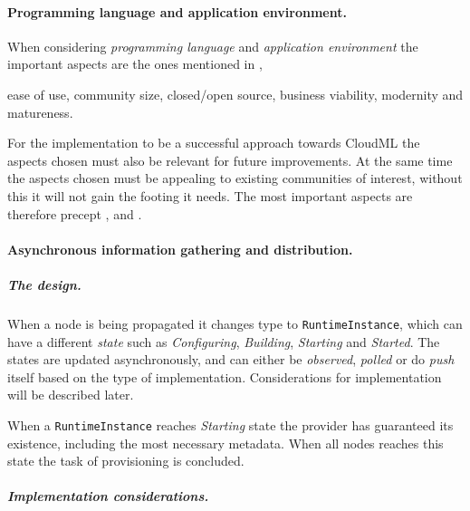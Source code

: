 


\paragraph{Programming language and application environment.}

When considering \emph{programming language} and \emph{application environment} 
the important aspects are the ones mentioned in ,
\begin{ii}
  \iitem ease of use,
  \iitem community size,
  \iitem closed/open source,
  \iitem business viability,
  \iitem modernity and 
  \iitem matureness.
\end{ii}
For the implementation to be a successful approach towards CloudML 
the aspects chosen must also be relevant for future improvements.
At the same time the aspects chosen must be appealing to existing communities of interest,
without this it will not gain the footing it needs.
The most important aspects are therefore precept ,  and .

\paragraph{Asynchronous information gathering and distribution.}

\subparagraph{The design.}

When a node is being propagated it changes type to \texttt{RuntimeInstance}, 
which can have a different \emph{state} such as 
\emph{Configuring}, \emph{Building}, \emph{Starting} and \emph{Started}.
The states are updated asynchronously, and can either be 
\emph{observed}, \emph{polled} or do \emph{push} itself based on the type of implementation.
Considerations for implementation will be described later.

When a \texttt{RuntimeInstance} reaches \emph{Starting} state the provider 
has guaranteed its existence, including the most necessary metadata.
When all nodes reaches this state the task of provisioning is concluded.

\subparagraph{Implementation considerations.}

